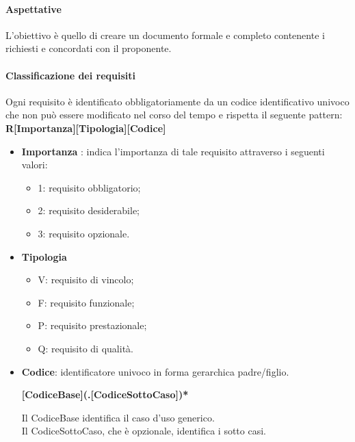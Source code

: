 \paragraph{Aspettative}
L'obiettivo è quello di creare un documento formale e completo contenente i  richiesti e concordati con il proponente.

\paragraph{Classificazione dei requisiti} \label{_classificazioneRequisiti}
Ogni requisito è identificato obbligatoriamente da un codice identificativo univoco che non può essere modificato nel corso del tempo e rispetta il seguente pattern: \\
\textbf{R[Importanza][Tipologia][Codice]}

\begin{itemize}
  \item 	\textbf{Importanza} : indica l'importanza di tale requisito attraverso i seguenti valori:
        \begin{itemize}
          \item 1: requisito obbligatorio;
          \item 2: requisito desiderabile;
          \item 3: requisito opzionale.
        \end{itemize}
  \item \textbf{Tipologia}
        \begin{itemize}
          \item V: requisito di vincolo;
          \item F: requisito funzionale;
          \item P: requisito prestazionale;
          \item Q: requisito di qualità.
        \end{itemize}
  \item \textbf{Codice}: identificatore univoco in forma gerarchica padre/figlio. 
  	\begin{center}
  	 \textbf{[CodiceBase](.[CodiceSottoCaso])*} \\
  	\end{center}
       

        Il CodiceBase identifica il caso d'uso generico. \\
        Il CodiceSottoCaso, che è opzionale, identifica i sotto casi.
\end{itemize}

